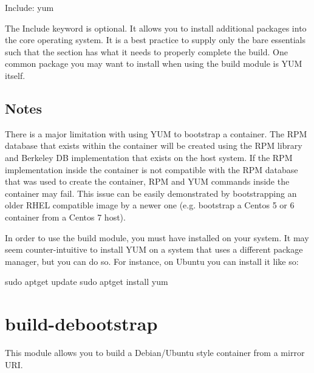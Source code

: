 \documentclass[letterpaper,10pt,english]{sphinxmanual}
\begin{document}
%
\begin{sphinxVerbatim}[commandchars=\\\{\}]
Include: yum
\end{sphinxVerbatim}

The Include keyword is optional. It allows you to install additional packages into the core operating system. It is a best practice to supply
only the bare essentials such that the  section has what it needs to properly complete the build. One common package you may want to install
when using the  build module is YUM itself.


\subsection{Notes}
\label{\detokenize{appendix:id13}}
There is a major limitation with using YUM to bootstrap a container. The RPM database that exists within the container will be created using the
RPM library and Berkeley DB implementation that exists on the host system. If the RPM implementation inside the container is not compatible with
the RPM database that was used to create the container, RPM and YUM commands inside the container may fail. This issue can be easily demonstrated
by bootstrapping an older RHEL compatible image by a newer one (e.g. bootstrap a Centos 5 or 6 container from a Centos 7 host).

In order to use the  build module, you must have  installed on your system. It may seem counter-intuitive to install YUM on a system
that uses a different package manager, but you can do so. For instance, on Ubuntu you can install it like so:

%
\begin{sphinxVerbatim}[commandchars=\\\{\}]
\PYGZdl{} sudo apt\PYGZhy{}get update \PYGZam{}\PYGZam{} sudo apt\PYGZhy{}get install yum
\end{sphinxVerbatim}


\section{build-debootstrap}
\label{\detokenize{appendix:build-debootstrap}}\label{\detokenize{appendix:id14}}\label{\detokenize{appendix:sec-build-debootstrap}}
This module allows you to build a Debian/Ubuntu style container from a mirror URI.
\end{document}
